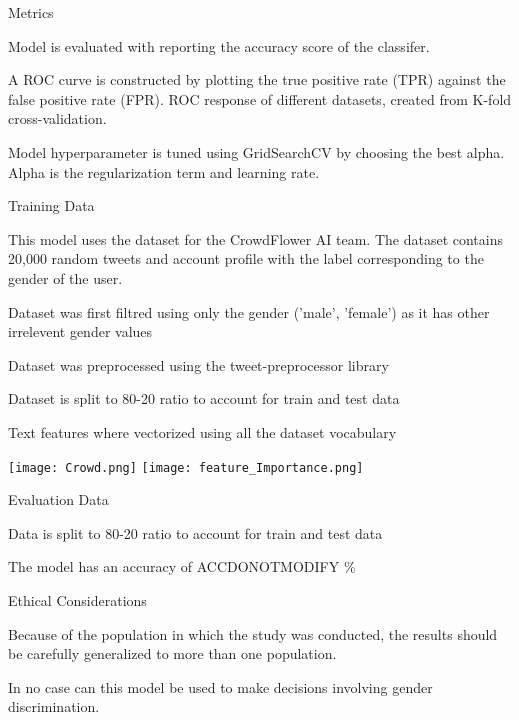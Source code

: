 \documentclass{article}
\begin{document}
\begin{adjustwidth}{-60pt}{-30pt}
\begin{singlespace}
\begin{tcolorbox}[title=\textbf{Model Card - Tweeter Gender Classification },
     breakable, sharp corners, boxrule=0.7pt]
{ \begin{mcsection}{Metrics}
     \item Model is evaluated with reporting the accuracy score of the classifer.
     
     \item A ROC curve is constructed by plotting the true positive rate (TPR) against the false positive rate (FPR). ROC response of different datasets, created from K-fold cross-validation.
     
     \item Model hyperparameter is tuned using GridSearchCV by choosing the best alpha. Alpha is the regularization term and learning rate.
     
 \end{mcsection}
 
 \begin{mcsection}{Training Data}
     \item This model uses the dataset for the CrowdFlower AI team.  The dataset contains 20,000 random tweets and account profile with the label corresponding to the gender of the user.
     \item Dataset was first filtred using only the gender ('male', 'female') as it has other irrelevent gender values
     \item Dataset was preprocessed using the tweet-preprocessor library 
     \item Dataset is split to 80-20 ratio to account for train and test data
     \item Text features where vectorized using all the dataset vocabulary 

 \end{mcsection}
     \texttt{[image: Crowd.png]}
    \texttt{[image: feature\_Importance.png]}
 
 \begin{mcsection}{Evaluation Data}
   
     \item Data is split to 80-20 ratio to account for train and test data
     \item The model has an accuracy of ACCDONOTMODIFY \%
  

 \end{mcsection}\pagebreak
 
 
 
 
 \begin{mcsection}{Ethical Considerations}
     \item Because of the population in which the study was conducted, the results should be carefully generalized to more than one population.
     \item In no case can this model be used to make decisions involving gender discrimination.
 \end{mcsection}
 
}
\end{tcolorbox}
\end{singlespace}
\end{adjustwidth}
\end{document}

